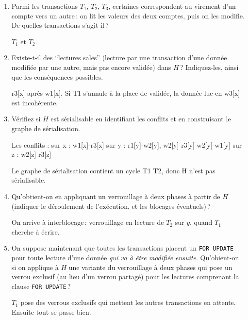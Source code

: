 \begin{enumerate}
  \item  Parmi les transactions $T_1$, $T_2$, $T_3$, certaines correspondent
     au virement d'un compte vers un autre\,: on lit les 
    valeurs des deux comptes, puis on les modifie. De quelles
         transactions s'agit-il\,?

\begin{correction}
      $T_1$ et $T_2$.
\end{correction}

  \item  Existe-t-il des ``lectures sales'' (lecture par une transaction
  d'une donn\'ee modifi\'ee par une autre, mais pas encore valid\'ee) dans $H$\,?
  Indiquez-les, ainsi que les cons\'equences possibles.
\begin{correction}
r3[x] apr\`es w1[x]. Si T1 s'annule \`a la place de valid\'ee, la donn\'ee lue en w3[x] est incoh\'erente.
\end{correction}

  \item  V\'erifiez si $H$ est s\'erialisable en 
    identifiant les conflits et en construisant le graphe de s\'erialisation.
\begin{correction}
      Les conflits :
      sur x : w1[x]-r3[x]
      sur y : r1[y]-w2[y], w2[y] r3[y] w2[y]-w1[y]
      sur z : w2[z] r3[z]

      Le graphe de s\'erialisation contient un cycle T1 T2, 
      donc H n'est pas s\'erialisable.
\end{correction}

\item  Qu'obtient-on en appliquant un verrouillage \`a 
       deux phases \`a partir de $H$ (indiquer le d\'eroulement de l'ex\'ecution,
        et les blocages \'eventuels)\,?

\begin{correction}
   On arrive \`a interblocage\,: verrouillage en lecture de $T_2$ sur $y$, quand
    $T_1$ cherche \`a \'ecrire.
\end{correction}

\item On suppose maintenant que toutes les transactions
    placent un \texttt{FOR UPDATE} pour toute lecture
    d'une donn\'ee {\em qui va \`a \^etre modifi\'ee ensuite}.  Qu'obient-on 
     si on applique \`a $H$ 
    une variante du verrouillage \`a deux phases
    qui pose un verrou exclusif (au lieu d'un verrou partag\'e) pour les
    lectures comprenant la clause \texttt{FOR UPDATE}\,? 

\begin{correction}
   $T_1$ pose des verrous exclusifs qui mettent les autres transactions
en attente.
 Ensuite tout se passe bien.
\end{correction}

\end{enumerate}